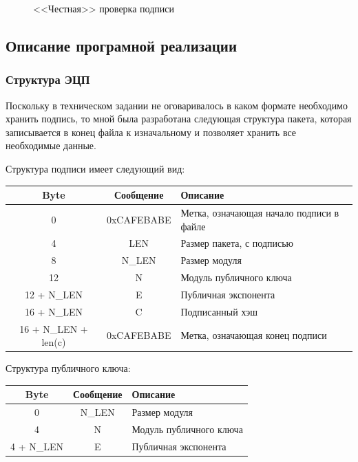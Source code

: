 \begin{figure}[h!]
  \caption{<<Честная>> проверка подписи}
\end{figure}

\clearpage
\newpage
\subsection{Описание програмной реализации}

\subsubsection{Структура ЭЦП}
Поскольку в техническом задании не оговаривалось в каком формате необходимо хранить подпись, то мной была разработана следующая структура
пакета, которая записывается в конец файла к изначальному и позволяет хранить все необходимые данные.

Структура подписи имеет следующий вид:
\begin{table}[h!]
  \centering
  \begin{tabular}{|c|c|l|}
    \hline 
    Byte & Сообщение & Описание\\ \hline
    0 & 0xCAFEBABE & Метка, означающая начало подписи в файле \\ \hline
    4 & LEN & Размер пакета, с подписью \\ \hline
    8 & N\_LEN & Размер модуля \\ \hline 
    12 & N & Модуль публичного ключа \\ \hline
    12 + N\_LEN & E & Публичная экспонента \\ \hline
    16 + N\_LEN & C & Подписанный хэш \\ \hline
    16 + N\_LEN + len(c) & 0xCAFEBABE & Метка, означающая конец подписи \\ \hline
  \end{tabular}
\end{table}

Структура публичного ключа:
\begin{table}[h!]
  \centering
  \begin{tabular}{|c|c|l|}
    \hline 
    Byte & Сообщение & Описание\\ \hline
    0 & N\_LEN & Размер модуля \\ \hline 
    4 & N & Модуль публичного ключа \\ \hline
    4 + N\_LEN & E & Публичная экспонента \\ \hline
  \end{tabular}
\end{table}


